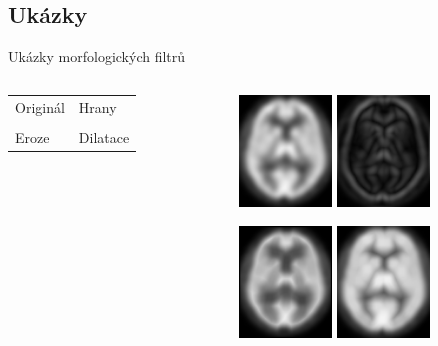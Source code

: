 \documentclass[compress,mathserif]{beamer}
\theoremstyle{definition}
\theoremstyle{plain}
\begin{document}
\subsection{Ukázky}
    \begin{frame}{Ukázky morfologických filtrů}

    \begin{columns}
    \begin{column}{0.3\textwidth}
        \begin{table}
          \begin{tabular}{ll}
            Originál \hfill & Hrany \hfill\\
            \vspace{2.5cm} & \\
            Eroze  & Dilatace \\
          \end{tabular}
        \end{table}
    \end{column}

    \begin{column}{0.6\textwidth}
    \begin{figure}
     \includegraphics[width = 70pt]{img/original.png}
             \hspace{10pt}
     \includegraphics[width = 70pt]{img/hrany.png}
    \end{figure}
    \vspace{-10pt}
    \begin{figure}
    \includegraphics[width = 70pt]{img/eroze.png}
         \hspace{10pt}
    \includegraphics[width = 70pt]{img/dilatace.png}
    \end{figure}
    \end{column}
    \end{columns}
    \end{frame}
    
\end{document}
